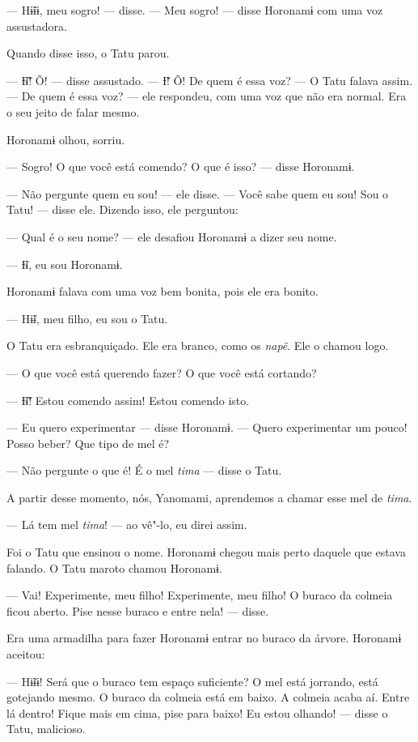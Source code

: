 --- Hɨ̃ɨɨ, meu sogro! --- disse. --- Meu sogro! --- disse Horonamɨ com
uma voz assustadora. 

Quando disse isso, o Tatu parou. 

--- Ɨ̃ɨ̃! Õ! --- disse assustado. --- Ɨ̃! Õ! De quem é essa voz? --- O Tatu
falava assim. --- De quem é essa voz? --- ele respondeu, com uma voz que
não era normal. Era o seu jeito de falar mesmo. 

Horonamɨ olhou, sorriu.

--- Sogro! O que você está comendo? O que é isso? --- disse Horonamɨ. 

--- Não pergunte quem eu sou! --- ele disse. --- Você sabe quem eu sou!
Sou o Tatu! --- disse ele. Dizendo isso, ele perguntou: 

--- Qual é o seu nome? --- ele desafiou Horonamɨ a dizer seu nome. 

--- Ɨ̃ɨ, eu sou Horonamɨ. 

Horonamɨ falava com uma voz bem bonita, pois ele era bonito. 

--- Hɨ̃ɨ, meu filho, eu sou o Tatu. 

O Tatu era esbranquiçado. Ele era branco, como os \emph{napë}. Ele o
chamou logo. 

--- O que você está querendo fazer? O que você está cortando? 

--- Ɨ̃ɨ̃! Estou comendo assim! Estou comendo isto.

--- Eu quero experimentar --- disse Horonamɨ. --- Quero experimentar um
pouco! Posso beber? Que tipo de mel é? 

--- Não pergunte o que é! É o mel \emph{tima} --- disse o Tatu. 

A partir desse momento, nós, Yanomami, aprendemos a chamar esse mel
de \emph{tima}. 

--- Lá tem mel \emph{tima}! --- ao vê"-lo, eu direi assim. 

Foi o Tatu que ensinou o nome. Horonamɨ chegou mais perto daquele que
estava falando. O Tatu maroto chamou Horonamɨ. 

--- Vai! Experimente, meu filho! Experimente, meu filho! O buraco da
colmeia ficou aberto. Pise nesse buraco e entre nela! --- disse. 

Era uma armadilha para fazer Horonamɨ entrar no buraco da árvore. Horonamɨ
aceitou: 

--- Hɨ̃ɨɨ! Será que o buraco tem espaço suficiente? O mel está jorrando,
está gotejando mesmo. O buraco da colmeia está em baixo. A colmeia acaba
aí. Entre lá dentro! Fique mais em cima, pise para baixo! Eu estou
olhando! --- disse o Tatu, malicioso. 

